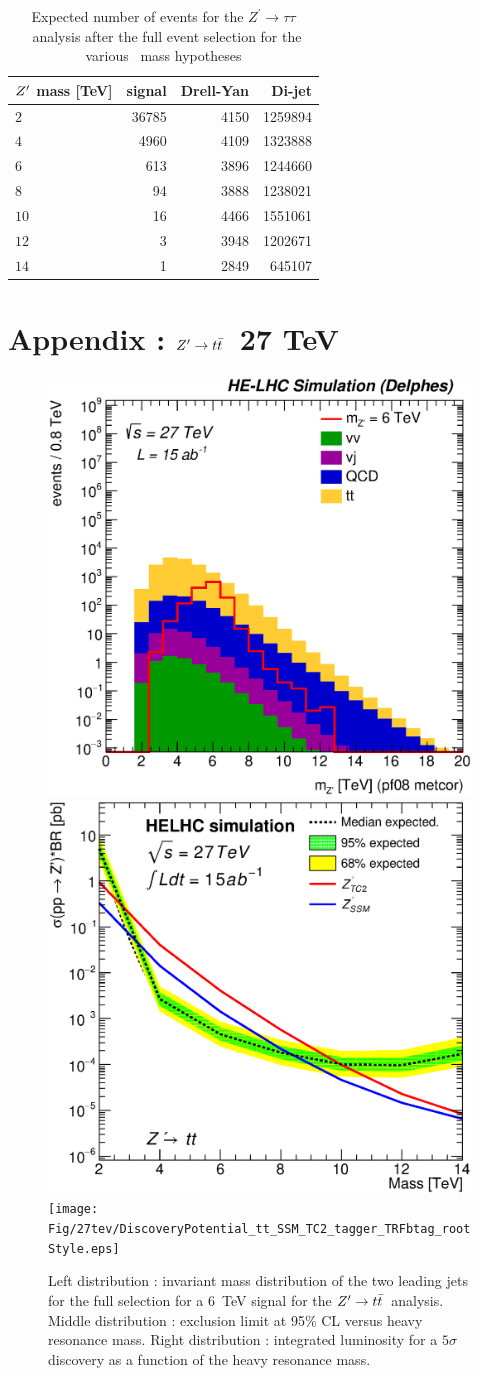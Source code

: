 \documentclass{cernrep}
\newcommand*{\Zptata}{\ensuremath{Z^{\prime}\rightarrow \tau\tau}}
\newcommand*{\zptt}{\ensuremath{Z^{\prime} \rightarrow \ttbar}}
\begin{document}
\begin{table}[!htb]
   \centering
\begin{tabular}{|l|r|r|r|}
  \hline
  \hline
$Z^{\prime}$ mass [TeV]  & signal &  Drell-Yan & Di-jet \\
  \hline
  $2$  & 36785 & 4150 & 1259894 \\
  $4$  &  4960 & 4109 & 1323888 \\
  $6$  &   613 & 3896 & 1244660 \\
  $8$  &    94 & 3888 & 1238021 \\
  $10$ &    16 & 4466 & 1551061 \\
  $12$ &     3 & 3948 & 1202671 \\
  $14$ &     1 & 2849 &  645107 \\
  \hline
  \hline
\end{tabular}
  \caption{Expected number of events for the \Zptata\ analysis after the full event selection for the various \Zp\ mass hypotheses}
  \label{tab:leptonicresonances27:yieldstautau}
\end{table}

\clearpage
\newpage

\section{Appendix : \zptt\ 27 TeV}
\label{appendix:zptt27}

\begin{figure}[!htb]
  \centering
  \includegraphics[width=0.30\columnwidth]{Fig/27tev/Zptt_Mj1j2_pf08_MetCorr_fit_sel8_nostack_log.eps}
  \includegraphics[width=0.30\columnwidth]{Fig/27tev/lim_Zprime_tt_helhc_v01.eps}
  \texttt{[image: Fig/27tev/DiscoveryPotential\_tt\_SSM\_TC2\_tagger\_TRFbtag\_rootStyle.eps]}
  \caption{Left distribution : invariant mass distribution of the two leading jets for the full selection for a 6~TeV signal for the \zptt\ analysis. Middle distribution : exclusion limit at 95\% CL versus heavy resonance mass. Right distribution : integrated luminosity for a $5\sigma$ discovery as a function of the heavy resonance mass.}
  \label{figure:hadronicresonances27:ttsel08}
\end{figure}
\end{document}
